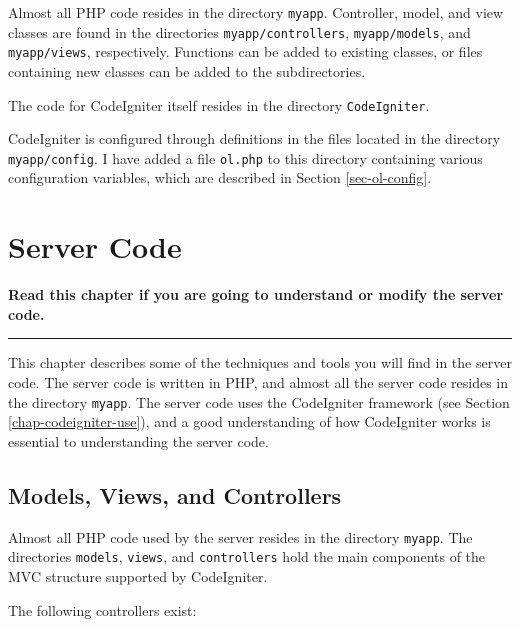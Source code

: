 \documentclass[11pt,oneside,a4paper]{memoir}
\begin{document}
Almost all PHP code resides in the directory \texttt{myapp}. Controller,
model, and view classes are found in the directories
\texttt{myapp/controllers}, \texttt{myapp/models}, and \texttt{myapp/views}, respectively. Functions
can be added to existing classes, or files containing new classes can be added to the
subdirectories.

The code for CodeIgniter itself resides in the directory \texttt{CodeIgniter}.

CodeIgniter is configured through definitions in the files located in the directory
\texttt{myapp/config}. I have added a file \texttt{ol.php} to this directory
containing various configuration variables, which are described in Section \ref{sec-ol-config}.


\chapter{Server Code}\label{chap-server-code}

\textbf{Read this chapter if you are going to understand or modify the server code.}
\plainbreak{3}

This chapter describes some of the techniques and tools you will find in the server code. The server
code is written in PHP, and almost all the server code resides in the directory
\texttt{myapp}. The server code uses the CodeIgniter framework (see Section
\ref{chap-codeigniter-use}), and a good understanding of how CodeIgniter works is essential to
understanding the server code.

\section{Models, Views, and Controllers}

Almost all PHP code used by the server resides in the directory \texttt{myapp}. The directories
\texttt{models}, \texttt{views}, and \texttt{controllers} hold the main components of the MVC
structure supported by CodeIgniter.

The following controllers exist:
\end{document}
